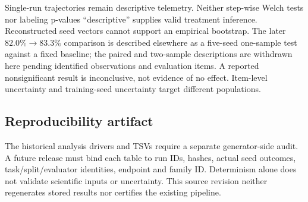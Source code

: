 Single-run trajectories remain descriptive telemetry. Neither step-wise
Welch tests nor labeling p-values ``descriptive'' supplies valid treatment
inference. Reconstructed seed vectors cannot support an empirical bootstrap.
The later $82.0\%\to83.3\%$ comparison is described elsewhere as a five-seed
one-sample test against a fixed baseline; the paired and two-sample descriptions
are withdrawn here pending identified observations and evaluation items.
A reported nonsignificant result is inconclusive, not evidence of no effect.
Item-level uncertainty and training-seed uncertainty target different populations.

\subsection{Reproducibility artifact}
\label{sec:stat-rigor-addendum:repro}

The historical analysis drivers and TSVs require a separate generator-side
audit. A future release must bind each table to run IDs, hashes, actual seed
outcomes, task/split/evaluator identities, endpoint and family ID. Determinism
alone does not validate scientific inputs or uncertainty. This source revision
neither regenerates stored results nor certifies the existing pipeline.
